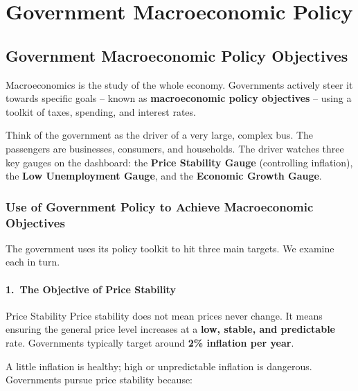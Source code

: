 \documentclass[11pt, a4paper, twoside]{book}
\begin{document}
\chapter{Government Macroeconomic Policy}

\section{Government Macroeconomic Policy Objectives}

\begin{coreidea}
Macroeconomics is the study of the whole economy. Governments actively steer it towards specific goals -- known as \textbf{macroeconomic policy objectives} -- using a toolkit of taxes, spending, and interest rates.
\end{coreidea}

Think of the government as the driver of a very large, complex bus. The passengers are businesses, consumers, and households. The driver watches three key gauges on the dashboard: the \textbf{Price Stability Gauge} (controlling inflation), the \textbf{Low Unemployment Gauge}, and the \textbf{Economic Growth Gauge}.

\subsection{Use of Government Policy to Achieve Macroeconomic Objectives}

The government uses its policy toolkit to hit three main targets. We examine each in turn.

\subsubsection{1.\ The Objective of Price Stability}

\begin{keyterm}{Price Stability}
Price stability does not mean prices never change. It means ensuring the general price level increases at a \textbf{low, stable, and predictable} rate. Governments typically target around \textbf{2\% inflation per year}.
\end{keyterm}

A little inflation is healthy; high or unpredictable inflation is dangerous. Governments pursue price stability because:
\end{document}
